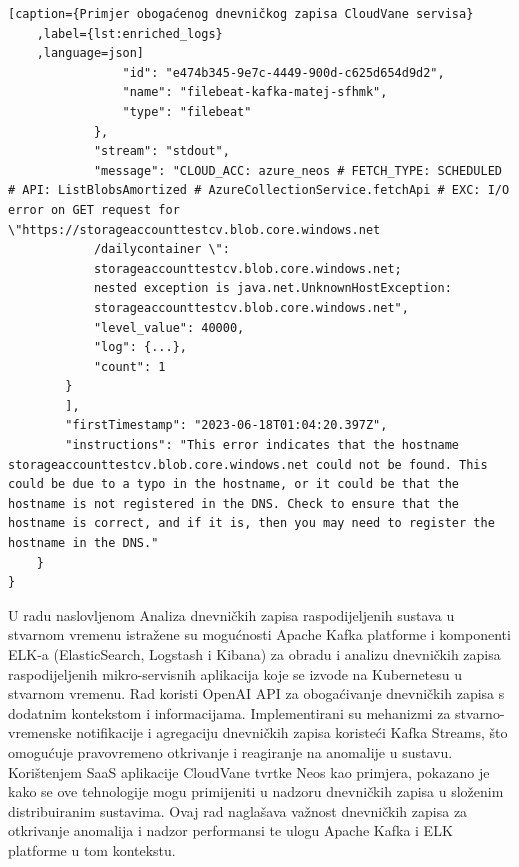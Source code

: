 \documentclass[times, utf8, diplomski]{fer}
\begin{document}
\begin{lstlisting}[caption={Primjer obogaćenog dnevničkog zapisa CloudVane servisa}
	,label={lst:enriched_logs}
	,language=json]
				"id": "e474b345-9e7c-4449-900d-c625d654d9d2",
				"name": "filebeat-kafka-matej-sfhmk",
				"type": "filebeat"
			},
			"stream": "stdout",
			"message": "CLOUD_ACC: azure_neos # FETCH_TYPE: SCHEDULED # API: ListBlobsAmortized # AzureCollectionService.fetchApi # EXC: I/O error on GET request for \"https://storageaccounttestcv.blob.core.windows.net
			/dailycontainer	\": 
			storageaccounttestcv.blob.core.windows.net; 
			nested exception is java.net.UnknownHostException: 
			storageaccounttestcv.blob.core.windows.net",
			"level_value": 40000,
			"log": {...},
			"count": 1
		}
		],
		"firstTimestamp": "2023-06-18T01:04:20.397Z",
		"instructions": "This error indicates that the hostname storageaccounttestcv.blob.core.windows.net could not be found. This could be due to a typo in the hostname, or it could be that the hostname is not registered in the DNS. Check to ensure that the hostname is correct, and if it is, then you may need to register the hostname in the DNS."
	}
}
\end{lstlisting}




\begin{sazetak}
U radu naslovljenom \glqq Analiza dnevničkih zapisa raspodijeljenih sustava u stvarnom vremenu\grqq\hspace{1pt} istražene su mogućnosti Apache Kafka platforme i komponenti ELK-a (ElasticSearch, Logstash i Kibana) za obradu i analizu dnevničkih zapisa raspodijeljenih mikro-servisnih aplikacija koje se izvode na Kubernetesu u stvarnom vremenu. Rad koristi OpenAI API za obogaćivanje dnevničkih zapisa s dodatnim kontekstom i informacijama. Implementirani su mehanizmi za stvarno-vremenske notifikacije i agregaciju dnevničkih zapisa koristeći Kafka Streams, što omogućuje pravovremeno otkrivanje i reagiranje na anomalije u sustavu. Korištenjem SaaS aplikacije CloudVane tvrtke Neos kao primjera, pokazano je kako se ove tehnologije mogu primijeniti u nadzoru dnevničkih zapisa u složenim distribuiranim sustavima. Ovaj rad naglašava važnost dnevničkih zapisa za otkrivanje anomalija i nadzor performansi te ulogu Apache Kafka i ELK platforme u tom kontekstu.

\end{sazetak}
\end{document}
